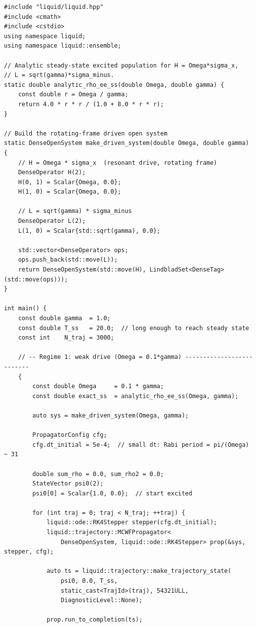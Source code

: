 \documentclass[11pt,a4paper,twoside]{book}
\theoremstyle{definition}
\theoremstyle{remark}
\begin{document}
\begin{verbatim}
#include "liquid/liquid.hpp"
#include <cmath>
#include <cstdio>
using namespace liquid;
using namespace liquid::ensemble;

// Analytic steady-state excited population for H = Omega*sigma_x,
// L = sqrt(gamma)*sigma_minus.
static double analytic_rho_ee_ss(double Omega, double gamma) {
    const double r = Omega / gamma;
    return 4.0 * r * r / (1.0 + 8.0 * r * r);
}

// Build the rotating-frame driven open system
static DenseOpenSystem make_driven_system(double Omega, double gamma) {
    // H = Omega * sigma_x  (resonant drive, rotating frame)
    DenseOperator H(2);
    H(0, 1) = Scalar{Omega, 0.0};
    H(1, 0) = Scalar{Omega, 0.0};

    // L = sqrt(gamma) * sigma_minus
    DenseOperator L(2);
    L(1, 0) = Scalar{std::sqrt(gamma), 0.0};

    std::vector<DenseOperator> ops;
    ops.push_back(std::move(L));
    return DenseOpenSystem(std::move(H), LindbladSet<DenseTag>(std::move(ops)));
}

int main() {
    const double gamma  = 1.0;
    const double T_ss   = 20.0;  // long enough to reach steady state
    const int    N_traj = 3000;

    // -- Regime 1: weak drive (Omega = 0.1*gamma) --------------------------
    {
        const double Omega     = 0.1 * gamma;
        const double exact_ss  = analytic_rho_ee_ss(Omega, gamma);

        auto sys = make_driven_system(Omega, gamma);

        PropagatorConfig cfg;
        cfg.dt_initial = 5e-4;  // small dt: Rabi period = pi/(Omega) ~ 31

        double sum_rho = 0.0, sum_rho2 = 0.0;
        StateVector psi0(2);
        psi0[0] = Scalar{1.0, 0.0};  // start excited

        for (int traj = 0; traj < N_traj; ++traj) {
            liquid::ode::RK4Stepper stepper(cfg.dt_initial);
            liquid::trajectory::MCWFPropagator<
                DenseOpenSystem, liquid::ode::RK4Stepper> prop(&sys, stepper, cfg);

            auto ts = liquid::trajectory::make_trajectory_state(
                psi0, 0.0, T_ss,
                static_cast<TrajId>(traj), 54321ULL,
                DiagnosticLevel::None);

            prop.run_to_completion(ts);


\end{verbatim}
\end{document}
